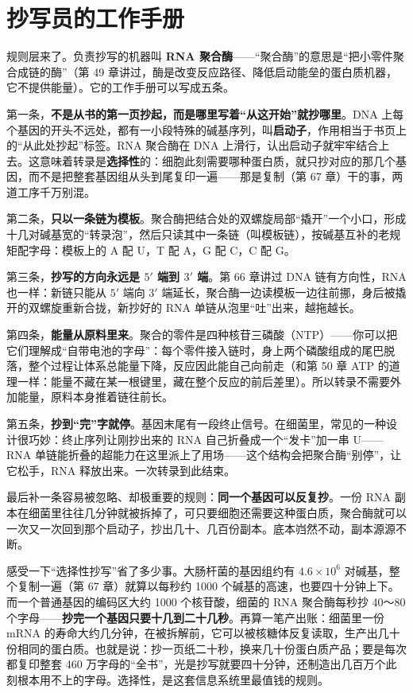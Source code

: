 \section{抄写员的工作手册}

规则层来了。负责抄写的机器叫 \textbf{RNA 聚合酶}——“聚合酶”的意思是“把小零件聚合成链的酶”（第 49 章讲过，酶是改变反应路径、降低启动能垒的蛋白质机器，它不提供能量）。它的工作手册可以写成五条。

第一条，\textbf{不是从书的第一页抄起，而是哪里写着“从这开始”就抄哪里}。DNA 上每个基因的开头不远处，都有一小段特殊的碱基序列，叫\textbf{启动子}，作用相当于书页上的“从此处抄起”标签。RNA 聚合酶在 DNA 上滑行，认出启动子就牢牢结合上去。这意味着转录是\textbf{选择性}的：细胞此刻需要哪种蛋白质，就只抄对应的那几个基因，而不是把整套基因组从头到尾复印一遍——那是复制（第 67 章）干的事，两道工序千万别混。

第二条，\textbf{只以一条链为模板}。聚合酶把结合处的双螺旋局部“撬开”一个小口，形成十几对碱基宽的“转录泡”，然后只读其中一条链（叫模板链），按碱基互补的老规矩配字母：模板上的 A 配 U，T 配 A，G 配 C，C 配 G。

第三条，\textbf{抄写的方向永远是 $5'$ 端到 $3'$ 端}。第 66 章讲过 DNA 链有方向性，RNA 也一样：新链只能从 $5'$ 端向 $3'$ 端延长，聚合酶一边读模板一边往前挪，身后被撬开的双螺旋重新合拢，新抄好的 RNA 单链从泡里“吐”出来，越拖越长。

第四条，\textbf{能量从原料里来}。聚合的零件是四种核苷三磷酸（NTP）——你可以把它们理解成“自带电池的字母”：每个零件接入链时，身上两个磷酸组成的尾巴脱落，整个过程让体系总能量下降，反应因此能自己向前走（和第 50 章 ATP 的道理一样：能量不藏在某一根键里，藏在整个反应的前后差里）。所以转录不需要外加能量，原料本身推着链往前长。

第五条，\textbf{抄到“完”字就停}。基因末尾有一段终止信号。在细菌里，常见的一种设计很巧妙：终止序列让刚抄出来的 RNA 自己折叠成一个“发卡”加一串 U——RNA 单链能折叠的超能力在这里派上了用场——这个结构会把聚合酶“别停”，让它松手，RNA 释放出来。一次转录到此结束。

最后补一条容易被忽略、却极重要的规则：\textbf{同一个基因可以反复抄}。一份 RNA 副本在细菌里往往几分钟就被拆掉了，可只要细胞还需要这种蛋白质，聚合酶就可以一次又一次回到那个启动子，抄出几十、几百份副本。底本岿然不动，副本源源不断。

\begin{qiaoliang}
感受一下“选择性抄写”省了多少事。大肠杆菌的基因组约有 $4.6\times 10^{6}$ 对碱基，整个复制一遍（第 67 章）就算以每秒约 1000 个碱基的高速，也要四十分钟上下。而一个普通基因的编码区大约 1000 个核苷酸，细菌的 RNA 聚合酶每秒抄 40～80 个字母——\textbf{抄完一个基因只要十几到二十几秒}。再算一笔产出账：细菌里一份 mRNA 的寿命大约几分钟，在被拆解前，它可以被核糖体反复读取，生产出几十份相同的蛋白质。也就是说：抄一页纸二十秒，换来几十份蛋白质产品；要是每次都复印整套 460 万字母的“全书”，光是抄写就要四十分钟，还制造出几百万个此刻根本用不上的字母。选择性，是这套信息系统里最值钱的规则。
\end{qiaoliang}

